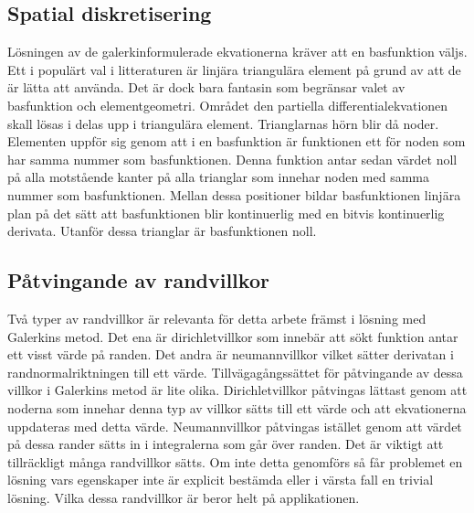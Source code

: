 \subsection{Spatial diskretisering}

Lösningen av de galerkinformulerade ekvationerna kräver att en basfunktion väljs.
Ett i populärt val i litteraturen är linjära triangulära element på grund av att de
är lätta att använda. Det är dock bara fantasin som begränsar valet av basfunktion
och elementgeometri.
\cite{johnson2009}\cite{lewis04}\cite{reddy93}\cite{fem50} Området den
partiella differentialekvationen skall lösas i delas upp i triangulära element.
Trianglarnas hörn blir då noder. Elementen uppför sig genom att i en basfunktion
är funktionen ett för noden som har samma nummer som basfunktionen. Denna funktion
antar sedan värdet noll på alla motstående kanter på alla trianglar som innehar noden
med samma nummer som basfunktionen. Mellan dessa positioner bildar basfunktionen
linjära plan på det sätt att basfunktionen blir kontinuerlig med en bitvis
kontinuerlig derivata.
Utanför dessa trianglar är basfunktionen noll. \cite{johnson2009}

\subsection{Påtvingande av randvillkor}
\label{subsec:boundaryenforcement}
Två typer av randvillkor är relevanta för detta arbete främst i lösning med Galerkins 
metod. Det ena är dirichletvillkor som
innebär att sökt funktion antar ett visst värde på randen. Det andra är neumannvillkor
vilket sätter derivatan i randnormalriktningen till ett värde. Tillvägagångssättet
för påtvingande av dessa villkor i Galerkins metod är lite olika. Dirichletvillkor
påtvingas lättast genom att noderna som innehar denna typ av villkor sätts till ett värde
och att ekvationerna uppdateras med detta värde. Neumannvillkor påtvingas istället
genom att värdet på dessa rander sätts in i integralerna som går över randen. Det
är viktigt att tillräckligt många randvillkor sätts. Om inte detta genomförs
så får problemet en lösning vars egenskaper inte är explicit bestämda eller
i värsta fall en trivial lösning. Vilka dessa randvillkor är beror helt
på applikationen.
